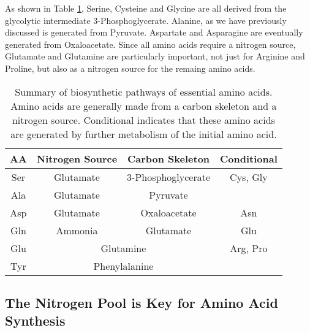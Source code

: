 \documentclass{tufte-handout}
\begin{document}
  As shown in Table \ref{tab:aa-biosynthesis-summary}, Serine, Cysteine and Glycine are all derived from the glycolytic intermediate 3-Phosphoglycerate.  Alanine, as we have previously discussed is generated from Pyruvate.  Aspartate and Asparagine are eventually generated from Oxaloacetate.  Since all amino acids require a nitrogen source, Glutamate and Glutamine are particularly important, not just for Arginine and Proline, but also as a nitrogen source for the remaing amino acids. 

\begin{table}[h]
\centering
\caption{Summary of biosynthetic pathways of essential amino acids.  Amino acids are generally made from a carbon skeleton and a nitrogen source.  Conditional indicates that these amino acids are generated by further metabolism of the initial amino acid.}
\label{tab:aa-biosynthesis-summary}
\begin{tabular}{|c|c|c|c|}
\hline
AA        & Nitrogen Source  & Carbon Skeleton & Conditional      \\ \hline
Ser    & Glutamate                            & 3-Phosphoglycerate                                 & Cys, Gly            \\ \hline
Ala   & Glutamate                            & Pyruvate                             &                              \\ \hline
Asp & Glutamate                         & Oxaloacetate                        & Asn                   \\ \hline
Gln & Ammonia                              & Glutamate                            &   Glu                           \\ \hline
Glu & \multicolumn{2}{c|}{Glutamine}                                              & Arg, Pro \\ \hline
Tyr  & \multicolumn{2}{c|}{Phenylalanine}                                          &                              \\ \hline
\end{tabular}
\end{table}

\subsection{The Nitrogen Pool is Key for Amino Acid Synthesis}
\end{document}
